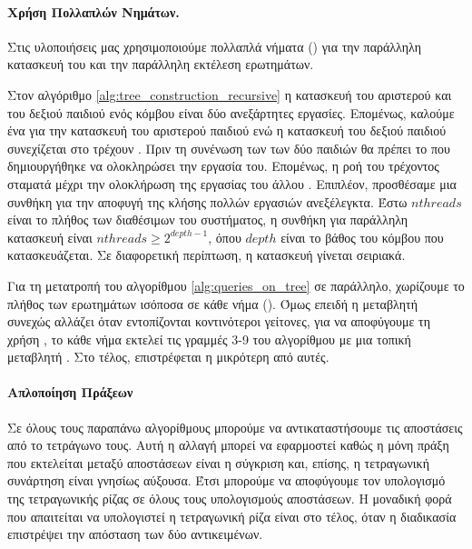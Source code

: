 \paragraph{Χρήση Πολλαπλών Νημάτων.}
Στις υλοποιήσεις μας χρησιμοποιούμε πολλαπλά νήματα ()
για την παράλληλη κατασκευή του  και την παράλληλη 
εκτέλεση ερωτημάτων.

Στον αλγόριθμο \ref{alg:tree_construction_recursive} 
η κατασκευή του αριστερού και του δεξιού παιδιού ενός κόμβου
είναι  δύο ανεξάρτητες εργασίες.
Επομένως, καλούμε ένα  για την κατασκευή του 
αριστερού παιδιού ενώ η κατασκευή του δεξιού παιδιού συνεχίζεται 
στο τρέχουν .
Πριν τη συνένωση των  των δύο παιδιών θα πρέπει 
το  που δημιουργήθηκε να ολοκληρώσει την εργασία 
του. 
Επομένως, η ροή του τρέχοντος  σταματά μέχρι την 
ολοκλήρωση της εργασίας του άλλου .
Επιπλέον, προσθέσαμε μια συνθήκη για την αποφυγή της κλήσης 
πολλών εργασιών ανεξέλεγκτα.
Έστω $nthreads$ είναι το πλήθος των διαθέσιμων 
του συστήματος, η συνθήκη για παράλληλη κατασκευή είναι 
$nthreads \geq 2^{depth-1}$, όπου $depth$ είναι το βάθος του 
κόμβου που κατασκευάζεται.
Σε διαφορετική περίπτωση, η κατασκευή γίνεται σειριακά.

Για τη μετατροπή του αλγορίθμου \ref{alg:queries_on_tree} σε 
παράλληλο, χωρίζουμε το πλήθος των ερωτημάτων ισόποσα σε κάθε 
νήμα (). 
Όμως επειδή η μεταβλητή  συνεχώς αλλάζει
όταν εντοπίζονται κοντινότεροι γείτονες, για να αποφύγουμε τη 
χρήση , το κάθε νήμα εκτελεί τις γραμμές 3-9 
του αλγορίθμου με μια τοπική μεταβλητή .
Στο τέλος, επιστρέφεται η μικρότερη από αυτές.

\paragraph{Απλοποίηση Πράξεων}
Σε όλους τους παραπάνω αλγορίθμους μπορούμε να αντικαταστήσουμε 
τις αποστάσεις από το τετράγωνο τους.
Αυτή η αλλαγή μπορεί να εφαρμοστεί καθώς η μόνη πράξη που 
εκτελείται μεταξύ αποστάσεων είναι η σύγκριση και, επίσης,
η τετραγωνική συνάρτηση είναι γνησίως αύξουσα.
Έτσι μπορούμε να αποφύγουμε τον υπολογισμό της τετραγωνικής ρίζας 
σε όλους τους υπολογισμούς αποστάσεων.
Η μοναδική φορά που απαιτείται να υπολογιστεί η τετραγωνική ρίζα 
είναι στο τέλος, όταν η διαδικασία επιστρέψει την απόσταση των 
δύο αντικειμένων.

